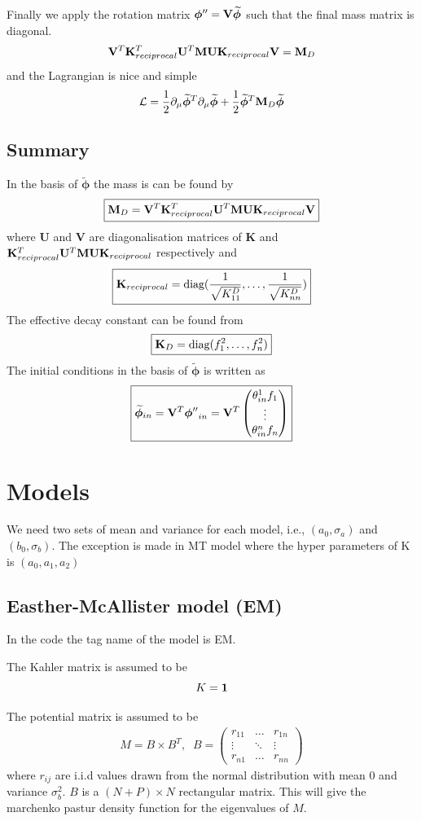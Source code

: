 \documentclass[12pt]{article}
\newcommand{\beq}{\begin{equation}}
\newcommand{\eeq}{\end{equation}}
\newcommand{\beqa}{\begin{eqnarray}}
\newcommand{\eeqa}{\end{eqnarray}}
\begin{document}
Finally we apply the rotation matrix ${\bm \phi''} = {\bf V} \widetilde{\bm \phi}$ such that the final mass matrix is diagonal.
\beq
{\bf V}^T {\bf K}_{reciprocal}^T {\bf U}^T {\bf M}  {\bf U} {\bf K}_{reciprocal} {\bf V} = {\bf M}_{D}
\eeq
and the Lagrangian is nice and simple
\beq
\mathcal{L} = {1\over 2} \partial_{\mu} \widetilde{\bm \phi}^T \partial_{\mu} \widetilde{\bm \phi} + {1\over 2} \widetilde{\bm \phi}^T {\bf M}_{D} \widetilde{\bm \phi}
\eeq

\subsection{Summary}
In the basis of $ \widetilde{\bm \phi}$ the mass is can be found by
\beq
\boxed{ {\bf M}_{D} = {\bf V}^T {\bf K}_{reciprocal}^T {\bf U}^T {\bf M}  {\bf U} {\bf K}_{reciprocal} {\bf V}}
\eeq
where ${\bm U}$ and ${\bm V}$ are diagonalisation matrices of ${\bm K}$ and ${\bf K}_{reciprocal}^T {\bf U}^T {\bf M}  {\bf U} {\bf K}_{reciprocal}$ respectively and 
\beq
\boxed{ {\bf K}_{reciprocal} = \text{diag}({1\over \sqrt{K^D_{11}}}, \ldots,  {1\over \sqrt{K^D_{nn}}})}
\eeq
The effective decay constant can be found from
\beq
\boxed{ {\bf K}_D = \text{diag}(f_{1}^2, \ldots, f_{n}^2)}
\eeq
The initial conditions in the basis of $\widetilde{\bm \phi}$ is written as
\beq
\boxed{ \widetilde{\bm \phi}_{in} = {\bf V}^T {\bm \phi''}_{in} = {\bf V}^T \begin{pmatrix} \theta_{in}^1 f_1 \\ \vdots \\ \theta_{in}^n f_n\end{pmatrix}}
\eeq

\section{Models}

We need two sets of mean and variance for each model, i.e., $(a_0,\sigma_a)$ and $(b_0,\sigma_b)$. The exception is made in MT model where  the hyper parameters of K is $(a_0, a_1, a_2)$

\subsection{Easther-McAllister model (EM)}

In the code the tag name of the model is EM.

The Kahler matrix is assumed to be
\beq
K = \bf 1
\eeq

The potential matrix is assumed to be
\beqa
M = B\times B^T,\;\; B = \begin{pmatrix} r_{11} & \ldots & r_{1n} \\ \vdots & \ddots & \vdots \\ r_{n1} & \ldots & r_{nn} \end{pmatrix}
\eeqa
where $r_{ij}$ are i.i.d values drawn from the normal distribution with mean 0 and variance $\sigma_b^2$. $B$ is a $(N +P)×N$ rectangular matrix. This will give the marchenko pastur density function for the eigenvalues of $M$.
\end{document}
